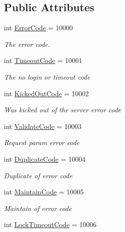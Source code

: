 \subsection*{Public Attributes}
\begin{DoxyCompactItemize}
\item 
int \mbox{\hyperlink{class_t_net_1_1_lang_1_1_language_a44e52b163e643daf2ab4b7cb27ea81f4}{Error\+Code}} = 10000
\begin{DoxyCompactList}\small\item\em The error code. \end{DoxyCompactList}\item 
int \mbox{\hyperlink{class_t_net_1_1_lang_1_1_language_adaad998ea9c55e29ca616238bb03a30c}{Timeout\+Code}} = 10001
\begin{DoxyCompactList}\small\item\em The no login or timeout code \end{DoxyCompactList}\item 
int \mbox{\hyperlink{class_t_net_1_1_lang_1_1_language_ac2373f5708633f977c4f248271006c29}{Kicked\+Out\+Code}} = 10002
\begin{DoxyCompactList}\small\item\em Was kicked out of the server error code \end{DoxyCompactList}\item 
int \mbox{\hyperlink{class_t_net_1_1_lang_1_1_language_aee77bbbba94f1e261dc70a18e63c1ff2}{Validate\+Code}} = 10003
\begin{DoxyCompactList}\small\item\em Request param error code \end{DoxyCompactList}\item 
int \mbox{\hyperlink{class_t_net_1_1_lang_1_1_language_a71ad4a2d5b8257a750801abf369d7f14}{Duplicate\+Code}} = 10004
\begin{DoxyCompactList}\small\item\em Duplicate of error code \end{DoxyCompactList}\item 
int \mbox{\hyperlink{class_t_net_1_1_lang_1_1_language_a6e8a827aaf8e28279890f58fc4a5f07c}{Maintain\+Code}} = 10005
\begin{DoxyCompactList}\small\item\em Maintain of error code \end{DoxyCompactList}\item 
int \mbox{\hyperlink{class_t_net_1_1_lang_1_1_language_a31effda7d2661df470ba44de9d05839a}{Lock\+Timeout\+Code}} = 10006

\end{DoxyCompactItemize}

